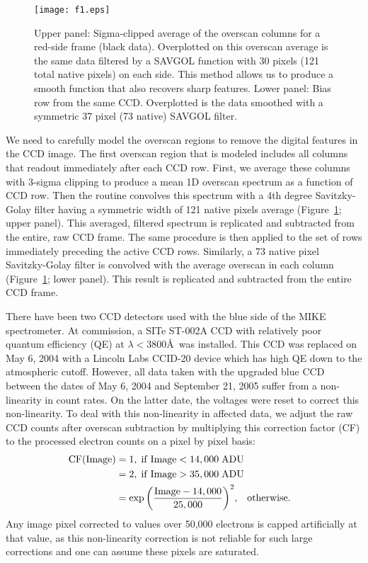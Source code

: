 \documentclass[]{emulateapj}
\begin{document}
\begin{figure}
\texttt{[image: f1.eps]}
\caption{Upper panel: Sigma-clipped average of the overscan columns
for a red-side frame (black data).  Overplotted on this overscan
average is the same data filtered by a SAVGOL function with 30 pixels
(121 total native pixels)
on each side.  This method allows us to produce a smooth function
that also recovers sharp features. %
Lower panel: Bias row from the same CCD.  Overplotted is the 
data smoothed with a symmetric 37 pixel (73 native) SAVGOL filter.
}
\label{fig:bias}
\end{figure}


We need to carefully model the overscan regions
to remove the digital features in the CCD image.  The first overscan
region that is modeled includes all columns that readout 
immediately after each CCD row.  First, we 
average these columns with 3-sigma clipping to produce a mean 1D 
overscan spectrum as a function of CCD row.
Then the routine convolves this spectrum with 
a 4th degree Savitzky-Golay filter having 
a symmetric width of 121 native pixels average 
(Figure~\ref{fig:bias}; upper panel). 
This averaged, filtered spectrum is replicated and subtracted from
the entire, raw CCD frame.  %
The same procedure is then applied to the set of rows 
immediately preceding the active CCD rows.  Similarly, a 73 native pixel 
Savitzky-Golay filter is convolved with the average overscan in each column
(Figure~\ref{fig:bias}; lower panel).
This result is replicated and subtracted from the entire CCD frame.

There have been two CCD detectors used with the blue side of
the MIKE spectrometer.  
At commission, a SITe ST-002A CCD with relatively poor quantum
efficiency (QE) at $\lambda < 3800$\AA\ was installed.  This CCD was
replaced on May 6, 2004 with a Lincoln Labs CCID-20 device which has
high QE down to the atmospheric cutoff.  However, all data taken with
the upgraded blue CCD between the dates of May 6, 2004 and September
21, 2005 suffer from a non-linearity in count rates.  On the latter
date, the voltages were reset to correct this non-linearity.  To deal
with this non-linearity in affected data, we adjust the raw CCD counts
after overscan subtraction by multiplying this correction factor (CF)
to the processed electron counts on a pixel by pixel basis:
\begin{eqnarray}
{\rm CF(Image)} &= 1, \; {\rm if \; Image} < 14,000 \;{\rm ADU} \\
                        &= 2, \; {\rm if \; Image} > 35,000 \;{\rm ADU} \nonumber\\
                        &= \exp{\left(\frac{{\rm Image}-14,000}{25,000}\right)^2}, 
                            \;\;\; {\rm otherwise.}\;\;\; \nonumber
\end{eqnarray}
Any image pixel corrected to values over 50,000 electrons is capped 
artificially at that value, as
this non-linearity correction is not reliable for such large corrections
and one can assume these pixels are saturated.
\end{document}
